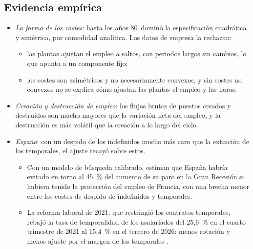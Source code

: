 \documentclass[11pt]{article}
\begin{document}
\subsection{Evidencia empírica}\label{sec:ajuste-evidencia}

\begin{itemize}
\item \emph{La forma de los costes}: hasta los años 80~dominó la especificación cuadrática y simétrica, por comodidad analítica. Los datos de empresa la rechazan\nocite{HamermeshPfann1996Adjustment}:
  \begin{itemize}
  \item las plantas ajustan el empleo a saltos, con periodos largos sin cambios, lo que apunta a un componente fijo\nocite{Hamermesh1989Labor};
  \item los costes son asimétricos y no necesariamente convexos, y sin costes no convexos no se explica cómo ajustan las plantas el empleo y las horas\nocite{CooperHaltiwangerWillis2015Dynamics}.
  \end{itemize}
\item \emph{Creación y destrucción de empleo}: los flujos brutos de puestos creados y destruidos son mucho mayores que la variación neta del empleo, y la destrucción es más volátil que la creación a lo largo del ciclo\nocite{DavisHaltiwanger1992Gross}.
\item \emph{España}: con un despido de los indefinidos mucho más caro que la extinción de los temporales, el ajuste recayó sobre estos.
  \begin{itemize}
  \item Con un modelo de búsqueda calibrado, \textcite{BentolilaEtAl2012Two} estiman que España habría evitado en torno al 45~\% del aumento de su paro en la Gran Recesión si hubiera tenido la protección del empleo de Francia, con una brecha menor entre los costes de despido de indefinidos y temporales.
  \item La reforma laboral de 2021\nocite{BOE2021RDL32}, que restringió los contratos temporales, rebajó la tasa de temporalidad de los asalariados del 25,6~\% en el cuarto trimestre de 2021 al 15,4~\% en el tercero de 2026\nocite{INE2026EPAContrato}: menos rotación y menos ajuste por el margen de los temporales .
  \end{itemize}
\end{itemize}

\end{document}
